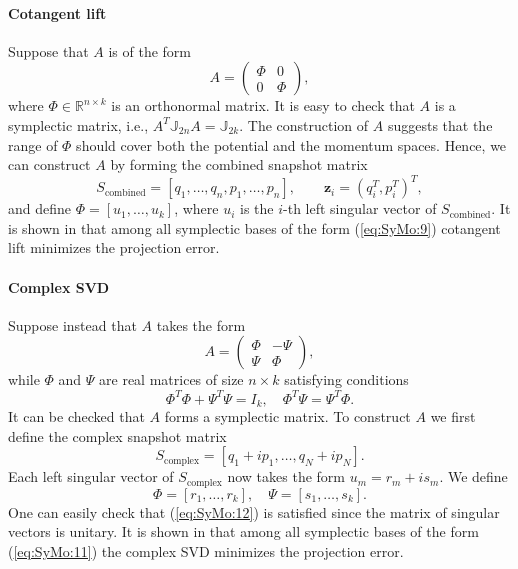 \documentclass[final]{siamart}
\begin{document}
\paragraph{\bf Cotangent lift} Suppose that $A$ is of the form
\begin{equation} \label{eq:SyMo:9}
	A = 
	\begin{pmatrix}
		\Phi & 0 \\
		0 & \Phi
	\end{pmatrix},
\end{equation}
where $\Phi \in \mathbb{R}^{n\times k}$ is an orthonormal matrix. It is easy to check that $A$ is a symplectic matrix, i.e., $A^T \mathbb J_{2n} A = \mathbb J_{2k}$. The construction of $A$ suggests that the range of $\Phi$ should cover both the potential and the momentum spaces. Hence, we can construct $A$ by forming the combined snapshot matrix
\begin{equation} \label{eq:SyMo:10}
	S_{\text{combined}} = [q_1,\dots,q_n,p_1,\dots,p_n], \qquad \mathbf z_i = (q_i^T,p_i^T)^T,
\end{equation}
and define $\Phi=[u_1,\dots,u_k]$, where $u_i$ is the $i$-th left singular vector of $S_{\text{combined}}$. It is shown in \cite{Peng:2014di} that among all symplectic bases of the form (\ref{eq:SyMo:9}) cotangent lift minimizes the projection error.

\paragraph{\bf Complex SVD} Suppose instead that $A$ takes the form \cite{Peng:2014di}
\begin{equation} \label{eq:SyMo:11}
	A = 
	\begin{pmatrix}
		\Phi & -\Psi \\
		\Psi & \Phi
	\end{pmatrix},
\end{equation}
while $\Phi$ and $\Psi$ are real matrices of size $n\times k$ satisfying conditions
\begin{equation} \label{eq:SyMo:12}
\Phi^T \Phi + \Psi^T \Psi = I_k,\quad \Phi^T \Psi = \Psi^T \Phi.
\end{equation}
It can be checked that $A$ forms a symplectic matrix. To construct $A$ we first define the complex snapshot matrix
\begin{equation} \label{eq:SyMo:13}
	S_{\text{complex}} = [ q_1 + i p_1, \dots , q_N + i p_N ].
\end{equation}
Each left singular vector of $S_{\text{complex}}$ now takes the form $u_m = r_m + i s_m$. We define
\begin{equation} \label{eq:SyMo:14}
	 \Phi = [r_1,\dots, r_k], \quad \Psi = [s_1,\dots, s_k].
\end{equation}
One can easily check that (\ref{eq:SyMo:12}) is satisfied {{\color{black}} since the matrix of singular vectors is unitary}. It is shown in \cite{Peng:2014di} that among all symplectic bases of the form (\ref{eq:SyMo:11}) the complex SVD minimizes the projection error.
\end{document}
